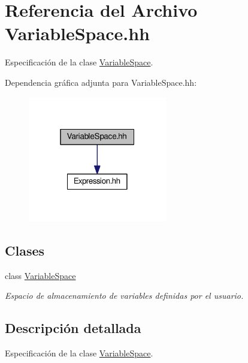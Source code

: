 \hypertarget{_variable_space_8hh}{}\section{Referencia del Archivo Variable\+Space.\+hh}
\label{_variable_space_8hh}


Especificación de la clase \hyperlink{class_variable_space}{Variable\+Space}.  


Dependencia gráfica adjunta para Variable\+Space.\+hh\+:\nopagebreak
\begin{figure}[H]
\begin{center}
\leavevmode
\includegraphics[width=172pt]{_variable_space_8hh__incl}
\end{center}
\end{figure}
\subsection*{Clases}
\begin{DoxyCompactItemize}
\item 
class \hyperlink{class_variable_space}{Variable\+Space}
\begin{DoxyCompactList}\small\item\em Espacio de almacenamiento de variables definidas por el usuario. \end{DoxyCompactList}\end{DoxyCompactItemize}


\subsection{Descripción detallada}
Especificación de la clase \hyperlink{class_variable_space}{Variable\+Space}. 

